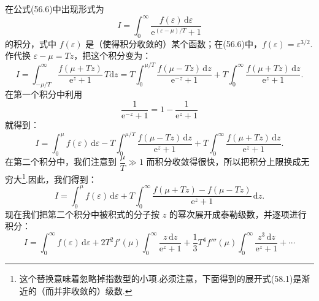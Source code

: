 在公式(56.6)中出现形式为
\begin{equation*}
  I=\int_0^{\infty}\frac{f(\varepsilon)\,\mathrm{d}\varepsilon}{\mathrm{e}^{(\varepsilon-\mu)/T}+1}
\end{equation*}
的积分，式中 $f(\varepsilon)$ 是（使得积分收敛的）某个函数；在(56.6)中，$f(\varepsilon)=\varepsilon^{3/2}$.作代换 $\varepsilon-\mu=Tz$，把这个积分变为：
\begin{equation*}
  I=\int_{-\mu/T}^{\infty}\frac{f(\mu+Tz)}{\mathrm{e}^z+1}\,T\mathrm{d}z
  =T\int_0^{\mu/T}\frac{f(\mu-Tz)\,\mathrm{d}z}{\mathrm{e}^{-z}+1}
  +T\int_0^{\infty}\frac{f(\mu+Tz)\,\mathrm{d}z}{\mathrm{e}^z+1}.
\end{equation*}
在第一个积分中利用
\begin{equation*}
  \frac{1}{\mathrm{e}^{-z}+1}=1-\frac{1}{\mathrm{e}^z+1}
\end{equation*}
就得到：
\begin{equation*}
  I=\int_0^{\mu}f(\varepsilon)\,\mathrm{d}\varepsilon
  -T\int_0^{\mu/T}\frac{f(\mu-Tz)\,\mathrm{d}z}{\mathrm{e}^z+1}
  +T\int_0^{\infty}\frac{f(\mu+Tz)\,\mathrm{d}z}{\mathrm{e}^z+1}.
\end{equation*}
在第二个积分中，我们注意到 $\dfrac{\mu}{T}\gg1$ 而积分收敛得很快，所以把积分上限换成无穷大\footnote{这个替换意味着忽略掉指数型的小项.必须注意，下面得到的展开式(58.1)是渐近的（而并非收敛的）级数.}.因此，我们得到：
\begin{equation*}
  I=\int_0^{\mu}f(\varepsilon)\,\mathrm{d}\varepsilon
  +T\int_0^{\infty}\frac{f(\mu+Tz)-f(\mu-Tz)}{\mathrm{e}^z+1}\,\mathrm{d}z.
\end{equation*}
现在我们把第二个积分中被积式的分子按 $z$ 的幂次展开成泰勒级数，并逐项进行积分：
\begin{equation*}
  I=\int_0^{\infty}f(\varepsilon)\,\mathrm{d}\varepsilon
  +2T^2f'(\mu)\int_0^{\infty}\frac{z\,\mathrm{d}z}{\mathrm{e}^z+1}
  +\frac{1}{3}T^4f'''(\mu)\int_0^{\infty}\frac{z^3\,\mathrm{d}z}{\mathrm{e}^z+1}+\cdots
\end{equation*}
